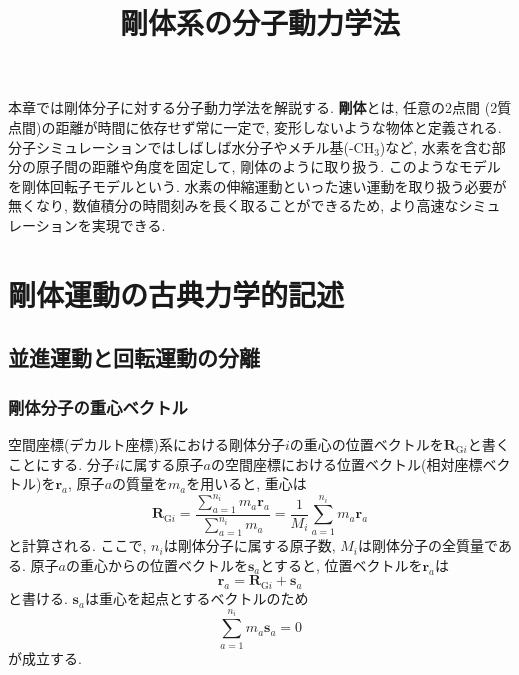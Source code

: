 





\title{剛体系の分子動力学法}
\maketitle
本章では剛体分子に対する分子動力学法を解説する.
\textbf{剛体}とは, 任意の2点間 (2質点間)の距離が時間に依存せず常に一定で, 変形しないような物体と定義される.
分子シミュレーションではしばしば水分子やメチル基(-CH$_{3}$)など, 水素を含む部分の原子間の距離や角度を固定して, 剛体のように取り扱う.
このようなモデルを剛体回転子モデルという.
水素の伸縮運動といった速い運動を取り扱う必要が無くなり, 数値積分の時間刻みを長く取ることができるため,
より高速なシミュレーションを実現できる.

\section{剛体運動の古典力学的記述}

\subsection{並進運動と回転運動の分離}
\subsubsection{剛体分子の重心ベクトル}

空間座標(デカルト座標)系における剛体分子$i$の重心の位置ベクトルを$\bm{R}_{\mathrm{G}i}$と書くことにする.
分子$i$に属する原子$a$の空間座標における位置ベクトル(相対座標ベクトル)を$\bm{r}_{a}$, 原子$a$の質量を$m_{a}$を用いると, 重心は
\begin{equation}
  \bm{R}_{\mathrm{G}i}
  =
  \frac{\sum_{a=1}^{n_{i}} m_{a} \bm{r}_{a}}{\sum_{a=1}^{n_{i}} m_{a}}
  =
  \frac{1}{M_{i}}
  \sum_{a=1}^{n_{i}} m_{a} \bm{r}_{a}
  \label{Eq:Vector_CoM}
\end{equation}
と計算される. ここで, $n_{i}$は剛体分子に属する原子数, $M_{i}$は剛体分子の全質量である.
原子$a$の重心からの位置ベクトルを$\bm{s}_{a}$とすると, 位置ベクトルを$\bm{r}_{a}$は
\begin{equation}
  \bm{r}_{a} = \bm{R}_{\mathrm{G}i} + \bm{s}_{a}
  \label{Eq:Vector_AtomPosition}
\end{equation}
と書ける. $\bm{s}_{a}$は重心を起点とするベクトルのため
\begin{equation}
  \sum_{a=1}^{n_{i}} m_{a} \bm{s}_{a} = 0
  \label{Eq:IEq_SiteVector}
\end{equation}
が成立する.




